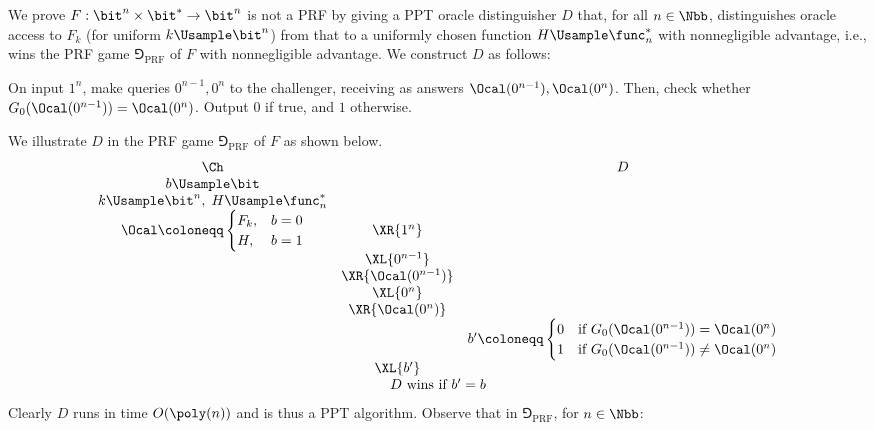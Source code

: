 \begin{answer}[a]
    We prove $F:\bit^n\times \bit^\ast\to\bit^n$ is not a PRF by giving a PPT oracle distinguisher $D$ that, for all $n\in\Nbb$, distinguishes oracle access to $F_k$ (for uniform $k\Usample\bit^n$) from that to a uniformly chosen function $H\Usample \func_n^\ast$ with nonnegligible advantage, i.e., wins the PRF game $\Game_{\textrm{PRF}}$ of $F$ with nonnegligible advantage. We construct $D$ as follows:
    \begin{mdframed}[style=simplebox]
        On input $1^n$, make queries $0^{n-1}, 0^n$ to the challenger, receiving as answers $\Ocal(0^{n-1}), \Ocal(0^n)$. Then, check whether $G_0(\Ocal(0^{n-1})) = \Ocal(0^n)$. Output $0$ if true, and $1$ otherwise.
    \end{mdframed}
    \noindent We illustrate $D$ in the PRF game $\Game_{\textrm{PRF}}$ of $F$ as shown below.
    {
        \[
            \begin{array}{@{} c c c @{}}
            \Ch & & D \\
            b\Usample\bit & & \\
            k\Usample\bit^{n},\; H\Usample \func_n^\ast & &\\
            \Ocal \coloneqq \begin{cases}
                F_{k}, &b=0\\
                H, &b=1
            \end{cases} & \XR{1^n} &\\
            & \XL{0^{n-1}} & \\
            & \XR{\Ocal(0^{n-1})} & \\
            & \XL{0^n} & \\
            & \XR{\Ocal(0^n)} & \\
            & & b'\coloneqq \begin{cases}
                0 &\textrm{if } G_0(\Ocal(0^{n-1})) = \Ocal(0^n)\\
                1 &\textrm{if } G_0(\Ocal(0^{n-1})) \neq \Ocal(0^n)
            \end{cases} \\
            & \XL{b'} & \\
            \multicolumn{3}{c}{\text{$D$ wins if $b' = b$}}
            \end{array}
        \]
        \label{fig:p4-game1}
    }
    Clearly $D$ runs in time $O(\poly(n))$ and is thus a PPT algorithm. Observe that in $\Game_{\textrm{PRF}}$, for $n\in\Nbb$:
    \begin{itemize}

\end{itemize}
\end{answer}
